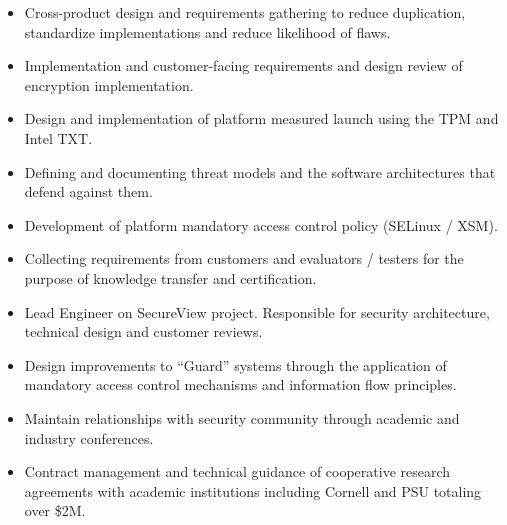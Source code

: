 \documentclass[letterpaper,11pt]{article}
\begin{document}
    \begin {itemize}
        \setlength {\itemsep}{1pt}
        \setlength {\parskip}{0pt}
        \setlength {\parsep}{0pt}
      \item Cross-product design and requirements gathering to reduce duplication, standardize implementations and reduce likelihood of flaws.
      \item Implementation and customer-facing requirements and design review of encryption implementation.
    \end {itemize}
    \begin {itemize}
        \setlength {\itemsep}{1pt}
        \setlength {\parskip}{0pt}
        \setlength {\parsep}{0pt}
      \item Design and implementation of platform measured launch using the TPM and Intel\textsuperscript{\textregistered} TXT.
      \item Defining and documenting threat models and the software architectures that defend against them.
      \item Development of platform mandatory access control policy (SELinux / XSM).
      \item Collecting requirements from customers and evaluators / testers for the purpose of knowledge transfer and certification.
    \end {itemize}
      \begin {itemize}
        \setlength {\itemsep}{1pt}
        \setlength {\parskip}{0pt}
        \setlength {\parsep}{0pt}
      \item Lead Engineer on SecureView project. Responsible for security architecture, technical design and customer reviews.
      \item Design improvements to ``Guard'' systems through the application of mandatory access control mechanisms and information flow principles.
      \item Maintain relationships with security community through academic and industry conferences.
      \item Contract management and technical guidance of cooperative research agreements with academic institutions including Cornell and PSU totaling over \$2M.
      \end {itemize}
\end{document}
